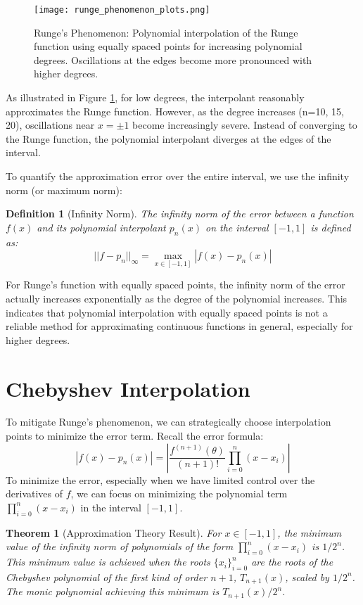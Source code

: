 \documentclass{article}
\newtheorem{theorem}{Theorem}
\newtheorem{definition}{Definition}
\begin{document}
\begin{figure}[H]
    \centering
    \texttt{[image: runge\_phenomenon\_plots.png]}
    \caption{Runge's Phenomenon: Polynomial interpolation of the Runge function using equally spaced points for increasing polynomial degrees. Oscillations at the edges become more pronounced with higher degrees.}
    \label{fig:runge_phenomenon}
\end{figure}

As illustrated in Figure \ref{fig:runge_phenomenon}, for low degrees, the interpolant reasonably approximates the Runge function. However, as the degree increases (n=10, 15, 20), oscillations near $x = \pm 1$ become increasingly severe. Instead of converging to the Runge function, the polynomial interpolant diverges at the edges of the interval.

To quantify the approximation error over the entire interval, we use the infinity norm (or maximum norm):
\begin{definition}[Infinity Norm]
The infinity norm of the error between a function $f(x)$ and its polynomial interpolant $p_n(x)$ on the interval $[-1, 1]$ is defined as:
\[
||f - p_n||_{\infty} = \max_{x \in [-1,1]} |f(x) - p_n(x)|
\]
\end{definition}

For Runge's function with equally spaced points, the infinity norm of the error actually increases exponentially as the degree of the polynomial increases. This indicates that polynomial interpolation with equally spaced points is not a reliable method for approximating continuous functions in general, especially for higher degrees.

\section{Chebyshev Interpolation}

To mitigate Runge's phenomenon, we can strategically choose interpolation points to minimize the error term. Recall the error formula:
\[
|f(x) - p_n(x)| = \left| \frac{f^{(n+1)}(\theta)}{(n+1)!} \prod_{i=0}^{n} (x - x_i) \right|
\]
To minimize the error, especially when we have limited control over the derivatives of $f$, we can focus on minimizing the polynomial term $ \prod_{i=0}^{n} (x - x_i) $ in the interval $[-1, 1]$.

\begin{theorem}[Approximation Theory Result]
For $x \in [-1, 1]$, the minimum value of the infinity norm of polynomials of the form $ \prod_{i=0}^{n} (x - x_i) $ is $1/2^n$. This minimum value is achieved when the roots $\{x_i\}_{i=0}^n$ are the roots of the Chebyshev polynomial of the first kind of order $n+1$, $T_{n+1}(x)$, scaled by $1/2^n$. The monic polynomial achieving this minimum is $T_{n+1}(x) / 2^n$.
\end{theorem}
\end{document}

